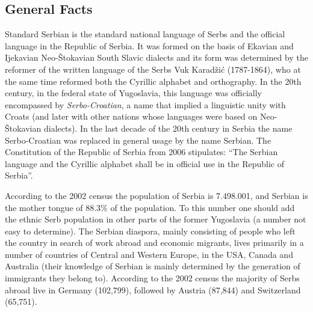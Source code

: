 \begin{multicols}{2}

\subsection{General Facts}

Standard Serbian is the standard national language of Serbs and the official language in the Republic of Serbia. It was formed on the basis of Ekavian and Ijekavian Neo-Štokavian South Slavic dialects and its form was determined by the reformer of the written language of the Serbs Vuk Karadžić (1787-1864), who at the same time reformed both the Cyrillic alphabet and orthography. In the 20th century, in the federal state of Yugoslavia, this language was officially encompassed by \textit{Serbo-Croatian}, a name that implied a linguistic unity with Croats (and later with other nations whose languages were based on Neo-Štokavian dialects).  In the last decade of the 20th century in Serbia the name Serbo-Croatian was replaced in general usage by the name Serbian. The Constitution of the Republic of Serbia from 2006 stipulates: “The Serbian language and the Cyrillic alphabet shall be in official use in the Republic of Serbia”. \cite{Ustav}

According to the 2002 census the population of Serbia is 7.498.001, \cite{VJN3} and Serbian is the mother tongue of 88.3\% of the population. \cite{HDR} To this number one should add the ethnic Serb population in other parts of the former Yugoslavia (a number not easy to determine). The Serbian diaspora, mainly consisting of people who left the country in search of work abroad and economic migrants, lives primarily in a number of countries of Central and Western Europe, in the USA, Canada and Australia (their knowledge of Serbian is mainly determined by the generation of immigrants they belong to).  According to the 2002 census the majority of Serbs abroad live in Germany (102,799), followed by Austria (87,844) and Switzerland (65,751).



\end{multicols}
